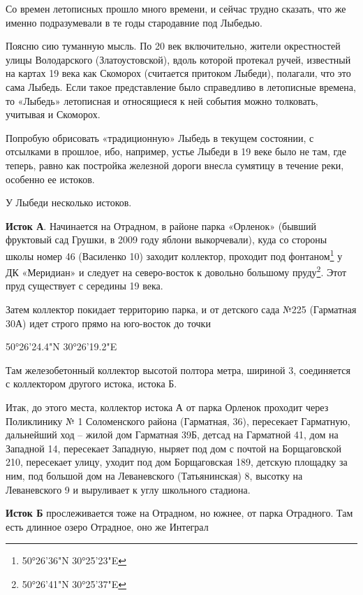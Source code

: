 Со времен летописных прошло много времени, и сейчас трудно сказать, что же именно подразумевали в те годы стародавние под Лыбедью. 

Поясню сию туманную мысль. По 20 век включительно, жители окрестностей улицы Володарского (Златоустовской), вдоль которой протекал ручей, известный на картах 19 века как Скоморох (считается притоком Лыбеди), полагали, что это сама Лыбедь. Если такое представление было справедливо в летописные времена, то «Лыбедь» летописная и относящиеся к ней события можно толковать, учитывая и Скоморох.

Попробую обрисовать «традиционную» Лыбедь в текущем состоянии, с отсылками в прошлое, ибо, например, устье Лыбеди в 19 веке было не там, где теперь, равно как постройка железной дороги внесла сумятицу в течение реки, особенно ее истоков.

У Лыбеди несколько истоков.

\textbf{Исток А}. Начинается на Отрадном, в районе парка «Орленок» (бывший фруктовый сад Грушки, в 2009 году яблони выкорчевали), куда со стороны школы номер 46 (Василенко 10) заходит коллектор, проходит под фонтаном\footnote{50°26'36"N 30°25'23"E} у ДК  «Меридиан» и следует на северо-восток к довольно большому пруду\footnote{50°26'41"N 30°25'37"E}. Этот пруд существует с середины 19 века.  

Затем коллектор покидает территорию парка, и от детского сада №225 (Гарматная 30А) идет строго прямо на юго-восток до точки

50°26'24.4"N 30°26'19.2"E


Там железобетонный коллектор высотой полтора метра, шириной 3, соединяется с коллектором другого истока, истока Б. 

Итак, до этого места, коллектор истока А от парка Орленок проходит через Поликлинику № 1 Соломенского района (Гарматная, 36), пересекает Гарматную, дальнейший ход – жилой дом Гарматная 39Б, детсад на Гарматной 41, дом на Западной 14, пересекает Западную, ныряет под дом с почтой на Борщаговской 210, пересекает улицу, уходит под дом Борщаговская 189, детскую площадку за ним, под большой дом на Леваневского (Татьянинская) 8, высотку на Леваневского 9 и выруливает к углу школьного стадиона. 

\textbf{Исток Б} прослеживается тоже на Отрадном, но южнее, от парка Отрадного. Там есть длинное озеро Отрадное, оно же Интеграл

